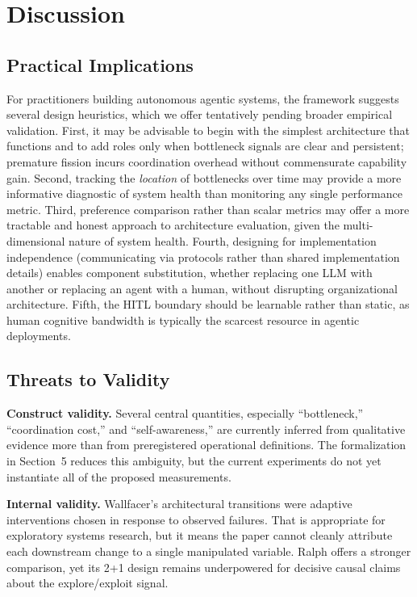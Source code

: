 \section{Discussion}

\subsection{Practical Implications}

For practitioners building autonomous agentic systems, the framework suggests several design heuristics, which we offer tentatively pending broader empirical validation. First, it may be advisable to begin with the simplest architecture that functions and to add roles only when bottleneck signals are clear and persistent; premature fission incurs coordination overhead without commensurate capability gain. Second, tracking the \emph{location} of bottlenecks over time may provide a more informative diagnostic of system health than monitoring any single performance metric. Third, preference comparison rather than scalar metrics may offer a more tractable and honest approach to architecture evaluation, given the multi-dimensional nature of system health. Fourth, designing for implementation independence (communicating via protocols rather than shared implementation details) enables component substitution, whether replacing one LLM with another or replacing an agent with a human, without disrupting organizational architecture. Fifth, the HITL boundary should be learnable rather than static, as human cognitive bandwidth is typically the scarcest resource in agentic deployments.

\subsection{Threats to Validity}

\textbf{Construct validity.} Several central quantities, especially ``bottleneck,'' ``coordination cost,'' and ``self-awareness,'' are currently inferred from qualitative evidence more than from preregistered operational definitions. The formalization in Section~5 reduces this ambiguity, but the current experiments do not yet instantiate all of the proposed measurements.

\textbf{Internal validity.} Wallfacer's architectural transitions were adaptive interventions chosen in response to observed failures. That is appropriate for exploratory systems research, but it means the paper cannot cleanly attribute each downstream change to a single manipulated variable. Ralph offers a stronger comparison, yet its 2+1 design remains underpowered for decisive causal claims about the explore/exploit signal.

